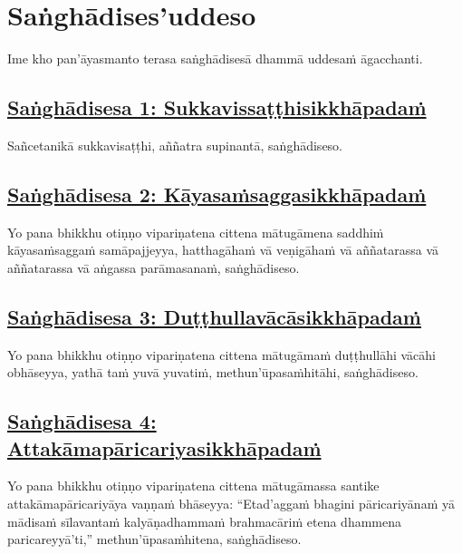 
\setsecheadstyle{\sectionFmt}
\section{Saṅghādises'uddeso}
\label{sd}

\begin{intro}
	Ime kho pan'āyasmanto terasa saṅghādisesā dhammā uddesaṁ āgacchanti.
\end{intro}

\subsection*{\hyperref[comm1]{Saṅghādisesa 1: Sukkavissaṭṭhisikkhāpadaṁ}}

\label{sd1}

Sañcetanikā sukkavisaṭṭhi, aññatra supinantā, saṅghādiseso.



\subsection*{\hyperref[comm2]{Saṅghādisesa 2: Kāyasaṁsaggasikkhāpadaṁ}}
\label{sd2}

Yo pana bhikkhu otiṇṇo vipariṇatena cittena mātugāmena saddhiṁ kāyasaṁsaggaṁ samāpajjeyya, hatthagāhaṁ vā veṇigāhaṁ vā aññatarassa vā aññatarassa vā aṅgassa parāmasanaṁ, saṅghādiseso.



\subsection*{\hyperref[comm3]{Saṅghādisesa 3: Duṭṭhullavācāsikkhāpadaṁ}}
\label{sd3}

Yo pana bhikkhu otiṇṇo vipariṇatena cittena mātugāmaṁ duṭṭhullāhi vācāhi obhāseyya, yathā taṁ yuvā yuvatiṁ, methun'ūpasaṁhitāhi, saṅghādiseso.



\subsection*{\hyperref[comm4]{Saṅghādisesa 4: Attakāmapāricariyasikkhāpadaṁ}}
\label{sd4}

Yo pana bhikkhu otiṇṇo vipariṇatena cittena mātugāmassa santike attakāmapāricariyāya vaṇṇaṁ bhāseyya: ``Etad'aggaṁ bhagini pāricariyānaṁ yā mādisaṁ sīlavantaṁ kalyāṇadhammaṁ brahmacāriṁ etena dhammena paricareyyā'ti,'' methun'ūpasaṁhitena, saṅghādiseso.



